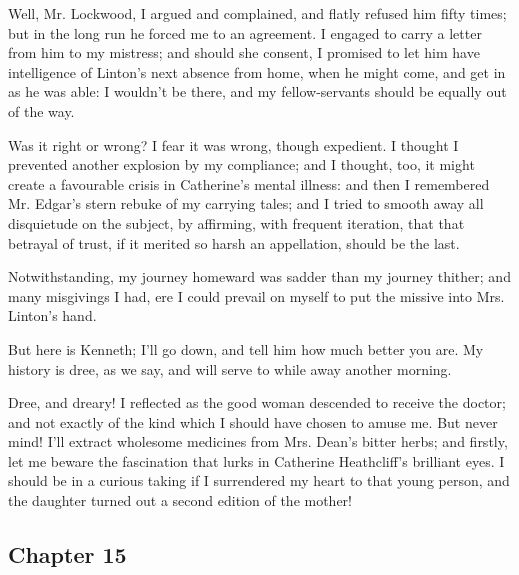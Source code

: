 \par Well, Mr. Lockwood, I argued and complained, and flatly refused him fifty times; but in the long run he forced me to an agreement. I engaged to carry a letter from him to my mistress; and should she consent, I promised to let him have intelligence of Linton's next absence from home, when he might come, and get in as he was able: I wouldn't be there, and my fellow-servants should be equally out of the way.
\par Was it right or wrong? I fear it was wrong, though expedient. I thought I prevented another explosion by my compliance; and I thought, too, it might create a favourable crisis in Catherine's mental illness: and then I remembered Mr. Edgar's stern rebuke of my carrying tales; and I tried to smooth away all disquietude on the subject, by affirming, with frequent iteration, that that betrayal of trust, if it merited so harsh an appellation, should be the last.
\par Notwithstanding, my journey homeward was sadder than my journey thither; and many misgivings I had, ere I could prevail on myself to put the missive into Mrs. Linton's hand.
\par But here is Kenneth; I'll go down, and tell him how much better you are. My history is dree, as we say, and will serve to while away another morning.
\par Dree, and dreary! I reflected as the good woman descended to receive the doctor; and not exactly of the kind which I should have chosen to amuse me. But never mind! I'll extract wholesome medicines from Mrs. Dean's bitter herbs; and firstly, let me beware the fascination that lurks in Catherine Heathcliff's brilliant eyes. I should be in a curious taking if I surrendered my heart to that young person, and the daughter turned out a second edition of the mother!






\subsection*{Chapter 15}

